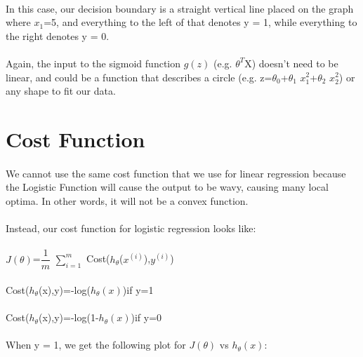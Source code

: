 \documentclass[UTF8]{ctexart}
\begin{document}
\paragraph{}
In this case, our decision boundary is a straight vertical line placed on the graph where $x_{1}$=5, and everything to the left of that denotes y = 1, while everything to the right denotes y = 0.
\paragraph{}
Again, the input to the sigmoid function $g(z)$ (e.g. $\theta^{T}$X) doesn't need to be linear, and could be a function that describes a circle (e.g. z=$\theta_{0}$+$\theta_{1}$ $x_{1}^{2}$+$\theta_{2}$ $x_{2}^{2}$) or any shape to fit our data.
\newpage
\section{Cost Function}
\paragraph{}
We cannot use the same cost function that we use for linear regression because the Logistic Function will cause the output to be wavy, causing many local optima. In other words, it will not be a convex function.
\paragraph{}
Instead, our cost function for logistic regression looks like:
\begin{algorithm}
\paragraph{}
$J(\theta)$=$\dfrac{1}{m}$ $\sum\limits_{i=1}^{m}$ Cost($h_{\theta}$($x^{(i)}$),$y^{(i)}$)
\paragraph{}
Cost($h_{\theta}$(x),y)=-log($h_{\theta}(x)$)\qquad if y=1
\paragraph{}
Cost($h_{\theta}$(x),y)=-log(1-$h_{\theta}(x)$)\qquad if y=0
\end{algorithm}
\paragraph{}
When y = 1, we get the following plot for $J(θ)$ vs $h_{\theta}(x)$:
\end{document}
